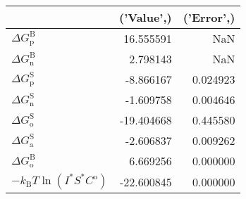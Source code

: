 \begin{tabular}{lrr}
\toprule
 & ('Value',) & ('Error',) \\
\midrule
$ \Delta G^\text{B}_\text{p}$ & 16.555591 & NaN \\
$ \Delta G^\text{B}_\text{n}$ & 2.798143 & NaN \\
$ \Delta G^\text{S}_\text{p}$ & -8.866167 & 0.024923 \\
$ \Delta G^\text{S}_\text{n}$ & -1.609758 & 0.004646 \\
$ \Delta G^\text{S}_\text{o}$ & -19.404668 & 0.445580 \\
$ \Delta G^\text{S}_\text{a}$ & -2.606837 & 0.009262 \\
$ \Delta G^\text{B}_\text{o} $ & 6.669256 & 0.000000 \\
$-k_\text{B} T \ln\left(I^* S^* C^\text{o} \right)$ & -22.600845 & 0.000000 \\
\bottomrule
\end{tabular}
